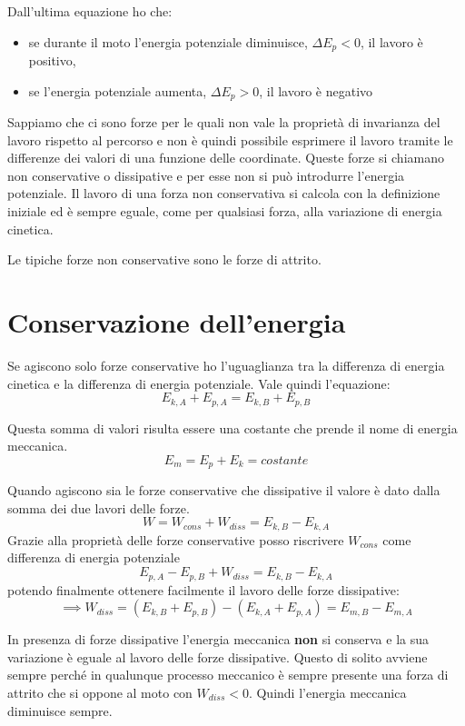 \documentclass[class=book, crop=false, oneside, 12pt]{standalone}
\begin{document}
Dall'ultima equazione ho che:
\begin{itemize}
    \item se durante il moto l'energia potenziale diminuisce, \(\Delta E_p <0\), il lavoro è positivo, 
    \item se l'energia potenziale aumenta, \(\Delta E_p >0\), il lavoro è negativo
\end{itemize}

Sappiamo che ci sono forze per le quali non vale la proprietà di invarianza del lavoro rispetto al percorso e non è quindi possibile esprimere il lavoro tramite le differenze dei valori di una funzione delle coordinate. 
Queste forze si chiamano non conservative o dissipative e per esse non si può introdurre l'energia potenziale. Il lavoro di una forza non conservativa si calcola con la definizione iniziale ed è sempre eguale, come per qualsiasi forza, alla variazione di energia cinetica.

Le tipiche forze non conservative sono le forze di attrito.

\section{Conservazione dell'energia}

Se agiscono solo forze conservative ho l'uguaglianza tra la differenza di energia cinetica e la differenza di energia potenziale.
Vale quindi l'equazione:
\begin{equation}
    E_{k,A} + E_{p,A} = E_{k,B} + E_{p,B}
\end{equation}

Questa somma di valori risulta essere una costante che prende il nome di energia meccanica.
\begin{equation}
    E_m = E_p + E_k = costante
\end{equation} 

Quando agiscono sia le forze conservative che dissipative il valore è dato dalla somma dei due lavori delle forze.
\begin{equation*}
    W = W_{cons} + W_{diss} = E_{k,B} - E_{k,A}
\end{equation*}
Grazie alla proprietà delle forze conservative posso riscrivere \(W_{cons}\) come differenza di energia potenziale
\begin{equation*}
    E_{p,A} - E_{p,B} + W_{diss} = E_{k,B} - E_{k,A}
\end{equation*}
potendo finalmente ottenere facilmente il lavoro delle forze dissipative:
\begin{equation}
    \implies W_{diss} = (E_{k,B} + E_{p,B}) - (E_{k,A} + E_{p,A}) = E_{m,B} - E_{m,A}
\end{equation}

In presenza di forze dissipative l'energia meccanica \textbf{non} si conserva e la sua variazione è eguale al lavoro delle forze dissipative.
Questo di solito avviene sempre perché in qualunque processo meccanico è sempre presente una forza di attrito che si oppone al moto con \(W_{diss}<0\).
Quindi l'energia meccanica diminuisce sempre.
\end{document}
